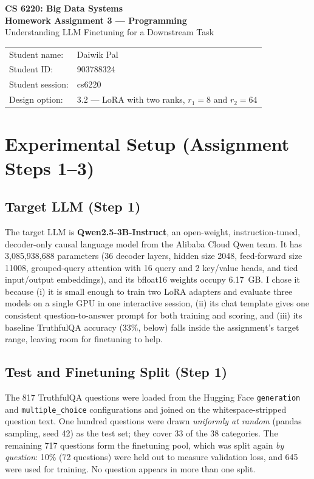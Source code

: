 \documentclass[11pt]{article}
\begin{document}
\begin{center}
  {\Large\textbf{CS 6220: Big Data Systems}}\\[0.4em]
  {\LARGE\textbf{Homework Assignment 3 --- Programming}}\\[0.4em]
  {\large Understanding LLM Finetuning for a Downstream Task}\\[1em]
\end{center}

\begin{tabular}{@{}ll@{}}
  Student name: & Daiwik Pal \\[0.4em]
  Student ID: & 903788324 \\[0.4em]
  Student session: & cs6220 \\[0.4em]
  Design option: & 3.2 --- LoRA with two ranks, $r_1 = 8$ and $r_2 = 64$ \\[0.4em]
\end{tabular}

\section{Experimental Setup (Assignment Steps 1--3)}

\subsection{Target LLM (Step 1)}

The target LLM is \textbf{Qwen2.5-3B-Instruct}, an open-weight, instruction-tuned, decoder-only causal language model from the Alibaba Cloud Qwen team. It has 3,085,938,688 parameters (36 decoder layers, hidden size 2048, feed-forward size 11008, grouped-query attention with 16 query and 2 key/value heads, and tied input/output embeddings), and its bfloat16 weights occupy 6.17~GB. I chose it because (i) it is small enough to train two LoRA adapters and evaluate three models on a single GPU in one interactive session, (ii) its chat template gives one consistent question-to-answer prompt for both training and scoring, and (iii) its baseline TruthfulQA accuracy (33\%, below) falls inside the assignment's target range, leaving room for finetuning to help.

\subsection{Test and Finetuning Split (Step 1)}

The 817 TruthfulQA questions were loaded from the Hugging Face \texttt{generation} and \texttt{multiple\_choice} configurations and joined on the whitespace-stripped question text. One hundred questions were drawn \emph{uniformly at random} (pandas sampling, seed 42) as the test set; they cover 33 of the 38 categories. The remaining 717 questions form the finetuning pool, which was split again \emph{by question}: 10\% (72 questions) were held out to measure validation loss, and 645 were used for training. No question appears in more than one split.
\end{document}
